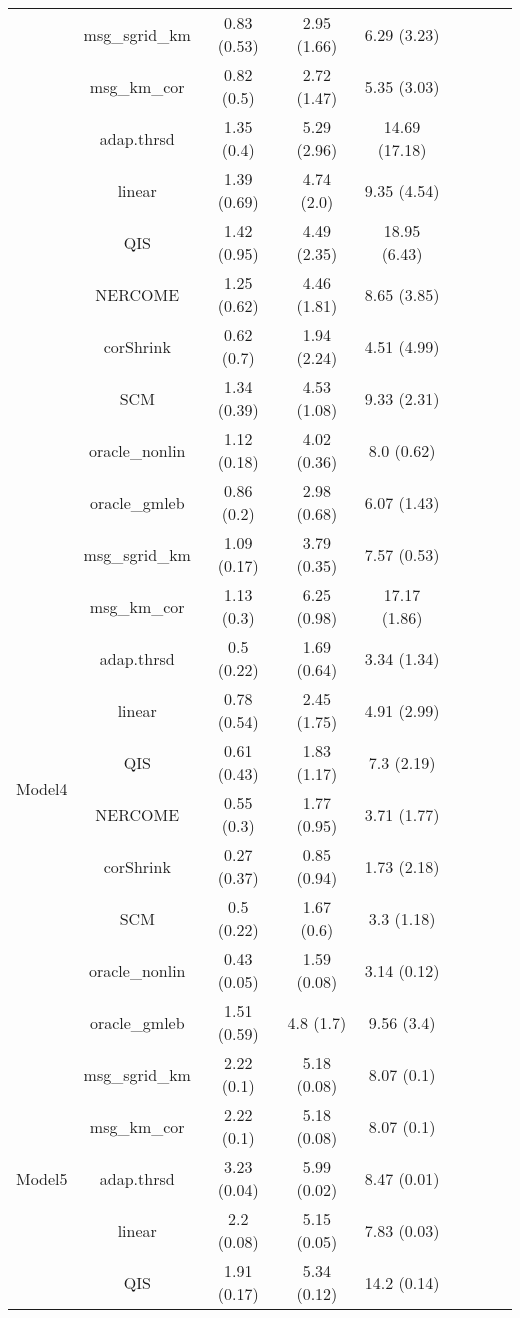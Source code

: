 \documentclass[useAMS,referee,usenatbib]{biom}
\begin{document}
\begin{table}[H]
{\begin{tabular}{ccccccccc}
  & msg\_sgrid\_km & 0.83 (0.53) & 2.95 (1.66) & 6.29 (3.23)   \\
 & msg\_km\_cor   & 0.82 (0.5)  & 2.72 (1.47) & 5.35 (3.03)   \\
 & adap.thrsd     & 1.35 (0.4)  & 5.29 (2.96) & 14.69 (17.18) \\
 & linear         & 1.39 (0.69) & 4.74 (2.0)  & 9.35 (4.54)   \\
 & QIS            & 1.42 (0.95) & 4.49 (2.35) & 18.95 (6.43)  \\
 & NERCOME        & 1.25 (0.62) & 4.46 (1.81) & 8.65 (3.85)   \\
 & corShrink      & 0.62 (0.7)  & 1.94 (2.24) & 4.51 (4.99)   \\
 & SCM            & 1.34 (0.39) & 4.53 (1.08) & 9.33 (2.31)   \\
 & oracle\_nonlin & 1.12 (0.18) & 4.02 (0.36) & 8.0 (0.62)    \\
 & oracle\_gmleb  & 0.86 (0.2)  & 2.98 (0.68) & 6.07 (1.43)  \\ \midrule
\multirow{10}{*}{Model4}  
 & msg\_sgrid\_km & 1.09 (0.17) & 3.79 (0.35) & 7.57 (0.53)  \\
 & msg\_km\_cor   & 1.13 (0.3)  & 6.25 (0.98) & 17.17 (1.86) \\
 & adap.thrsd     & 0.5 (0.22)  & 1.69 (0.64) & 3.34 (1.34)  \\
 & linear         & 0.78 (0.54) & 2.45 (1.75) & 4.91 (2.99)  \\
 & QIS            & 0.61 (0.43) & 1.83 (1.17) & 7.3 (2.19)   \\
 & NERCOME        & 0.55 (0.3)  & 1.77 (0.95) & 3.71 (1.77)  \\
 & corShrink      & 0.27 (0.37) & 0.85 (0.94) & 1.73 (2.18)  \\
 & SCM            & 0.5 (0.22)  & 1.67 (0.6)  & 3.3 (1.18)   \\
 & oracle\_nonlin & 0.43 (0.05) & 1.59 (0.08) & 3.14 (0.12)  \\
 & oracle\_gmleb  & 1.51 (0.59) & 4.8 (1.7)   & 9.56 (3.4) \\ \midrule
\multirow{10}{*}{Model5}  
 & msg\_sgrid\_km & 2.22 (0.1)  & 5.18 (0.08) & 8.07 (0.1)   \\
 & msg\_km\_cor   & 2.22 (0.1)  & 5.18 (0.08) & 8.07 (0.1)   \\
 & adap.thrsd     & 3.23 (0.04) & 5.99 (0.02) & 8.47 (0.01)  \\
 & linear         & 2.2 (0.08)  & 5.15 (0.05) & 7.83 (0.03)  \\
 & QIS            & 1.91 (0.17) & 5.34 (0.12) & 14.2 (0.14)  \\

\end{tabular}}
\end{table}
\end{document}
